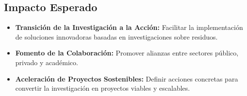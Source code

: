 \documentclass[11pt,a4paper]{article}
\begin{document}
\subsection{Impacto Esperado}
\begin{itemize}[leftmargin=*, label={--}]
    \item \textbf{Transición de la Investigación a la Acción:} Facilitar la implementación de soluciones innovadoras basadas en investigaciones sobre residuos.
    \item \textbf{Fomento de la Colaboración:} Promover alianzas entre sectores público, privado y académico.
    \item \textbf{Aceleración de Proyectos Sostenibles:} Definir acciones concretas para convertir la investigación en proyectos viables y escalables.
\end{itemize}

\newpage


\end{document}
